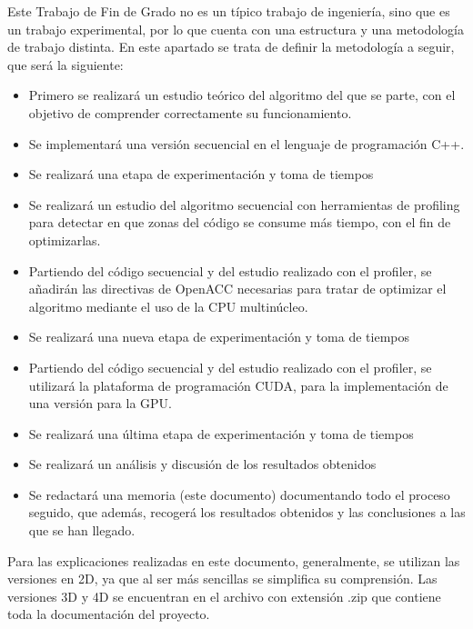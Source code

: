 Este Trabajo de Fin de Grado no es un típico trabajo de ingeniería, sino que es un trabajo experimental, por lo que cuenta con una estructura y una metodología de trabajo distinta. En este apartado se trata de definir la metodología a seguir, que será la siguiente: \\

\begin{itemize}
    \item Primero se realizará un estudio teórico del algoritmo del que se parte, con el objetivo de comprender correctamente su funcionamiento.
    \item Se implementará una versión secuencial en el lenguaje de programación C++.
    \item Se realizará una etapa de experimentación y toma de tiempos 
    \item Se realizará un estudio del algoritmo secuencial con herramientas de profiling para detectar en que zonas del código se consume más tiempo, con el fin de optimizarlas.
    \item Partiendo del código secuencial y del estudio realizado con el profiler, se añadirán las directivas de OpenACC necesarias para tratar de optimizar el algoritmo mediante el uso de la CPU multinúcleo.
    \item Se realizará una nueva etapa de experimentación y toma de tiempos
    \item Partiendo del código secuencial y del estudio realizado con el profiler, se utilizará la plataforma de programación CUDA, para la implementación de una versión para la GPU.
    \item Se realizará una última etapa de experimentación y toma de tiempos 
    \item Se realizará un análisis y discusión de los resultados obtenidos
    \item Se redactará una memoria (este documento) documentando todo el proceso seguido, que además, recogerá los resultados obtenidos y las conclusiones a las que se han llegado.
\end{itemize}
 
Para las explicaciones realizadas en este documento, generalmente, se utilizan las versiones en 2D, ya que al ser más sencillas se simplifica su comprensión. Las versiones 3D y 4D se encuentran en el archivo con extensión .zip que contiene toda la documentación del proyecto.